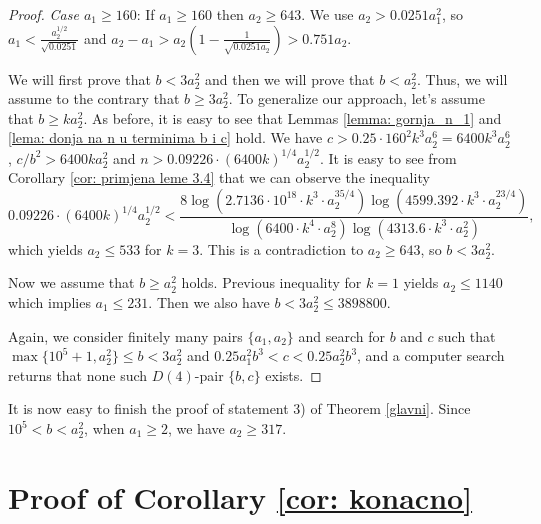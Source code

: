 \documentclass[12pt]{amsart}%
\theoremstyle{definition}
\theoremstyle{remark}
\theoremstyle{plain}
\begin{document}
\begin{proof}
\textit{ Case $a_1\geq 160$}: If $a_1\geq 160$ then $a_2\geq 643$. We use $a_2>0.0251a_1^2$, so $a_1<\frac{a_2^{1/2}}{\sqrt{0.0251}}$ and $a_2-a_1>a_2\left(1-\frac{1}{\sqrt{0.0251a_2}}\right)>0.751a_2$.


We will first prove that $b<3a_2^2$ and then we will prove that $b<a_2^2$. Thus, we will assume to the contrary that $b\geq 3a_2^2$. To generalize our approach, let's assume that $b\geq ka_2^2$. As before, it is easy to see that Lemmas \ref{lemma: gornja_n_1} and \ref{lema: donja na n u terminima b i c} hold. We have $c>0.25\cdot 160^2k^3a_2^6=6400k^3a_2^6$, $c/b^2>6400ka_2^2$  and $n>0.09226\cdot(6400k)^{1/4}a_2^{1/2}$. It is easy to see from Corollary \ref{cor: primjena leme 3.4} that we can observe the inequality
$$0.09226\cdot(6400k)^{1/4}a_2^{1/2}<\frac{8\log(2.7136\cdot 10^{18}\cdot k^3\cdot a_2^{35/4})\log(4599.392\cdot k^3\cdot a_2^{23/4})}{\log(6400\cdot k^4\cdot a_2^8)\log(4313.6\cdot k^3\cdot a_2^2)},$$
which yields $a_2\leq 533$ for $k=3$. This is a contradiction to $a_2\geq 643$, so $b<3a_2^2$. 

Now we assume that $b\geq a_2^2$ holds. Previous inequality for $k=1$ yields $a_2\leq 1140$ which implies $a_1\leq 231$. 
Then we also have $b<3a_2^2\leq 3898800$. 

Again, we consider finitely many pairs $\{a_1,a_2\}$ and search for $b$ and $c$ such that $\max\{10^5+1,a_2^2\}\leq b<3a_2^2$ and $0.25a_1^2b^3<c<0.25a_2^2b^3$, and a computer search returns that none such $D(4)$-pair $\{b,c\}$ exists.
\end{proof}

It is now easy to finish the proof of statement 3) of Theorem \ref{glavni}. Since $10^5<b<a_2^2$, when $a_1\geq 2$, we have $a_2\geq 317.$

\section{Proof of Corollary \ref{cor: konacno}}
\end{document}
